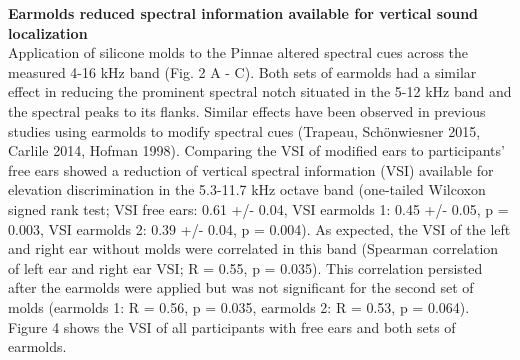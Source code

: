 \noindent \textbf{Earmolds reduced spectral information available for vertical sound localization}\\
Application of silicone molds to the Pinnae altered spectral cues across the measured 4-16 kHz band (Fig. 2 A - C). Both sets of earmolds had a similar effect in reducing the prominent spectral notch situated in the 5-12 kHz band and the spectral peaks to its flanks. Similar effects have been observed in previous studies using earmolds to modify spectral cues (Trapeau, Schönwiesner 2015, Carlile 2014, Hofman 1998). Comparing the VSI of modified ears to participants’ free ears showed a reduction of vertical spectral information (VSI) available for elevation discrimination in the 5.3-11.7 kHz octave band (one-tailed Wilcoxon signed rank test; VSI free ears: 0.61 +/- 0.04, VSI earmolds 1: 0.45 +/- 0.05, p = 0.003, VSI earmolds 2: 0.39 +/- 0.04, p = 0.004). As expected, the VSI of the left and right ear without molds were correlated in this band (Spearman correlation of left ear and right ear VSI; R = 0.55, p = 0.035). This correlation persisted after the earmolds were applied but was not significant for the second set of molds (earmolds 1: R = 0.56, p = 0.035, earmolds 2: R = 0.53, p = 0.064). Figure 4 shows the VSI of all participants with free ears and both sets of earmolds.\\

